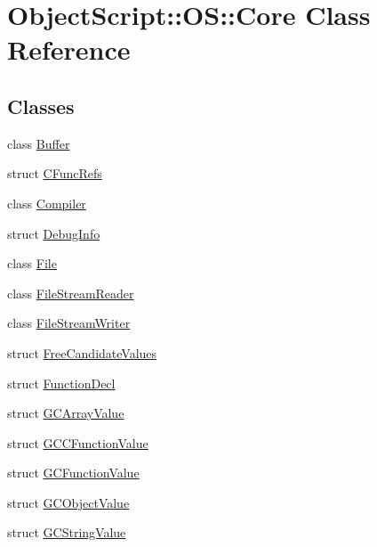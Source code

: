 \hypertarget{class_object_script_1_1_o_s_1_1_core}{}\section{Object\+Script\+:\+:OS\+:\+:Core Class Reference}
\label{class_object_script_1_1_o_s_1_1_core}
\subsection*{Classes}
\begin{DoxyCompactItemize}
\item 
class \hyperlink{class_object_script_1_1_o_s_1_1_core_1_1_buffer}{Buffer}
\item 
struct \hyperlink{struct_object_script_1_1_o_s_1_1_core_1_1_c_func_refs}{C\+Func\+Refs}
\item 
class \hyperlink{class_object_script_1_1_o_s_1_1_core_1_1_compiler}{Compiler}
\item 
struct \hyperlink{struct_object_script_1_1_o_s_1_1_core_1_1_debug_info}{Debug\+Info}
\item 
class \hyperlink{class_object_script_1_1_o_s_1_1_core_1_1_file}{File}
\item 
class \hyperlink{class_object_script_1_1_o_s_1_1_core_1_1_file_stream_reader}{File\+Stream\+Reader}
\item 
class \hyperlink{class_object_script_1_1_o_s_1_1_core_1_1_file_stream_writer}{File\+Stream\+Writer}
\item 
struct \hyperlink{struct_object_script_1_1_o_s_1_1_core_1_1_free_candidate_values}{Free\+Candidate\+Values}
\item 
struct \hyperlink{struct_object_script_1_1_o_s_1_1_core_1_1_function_decl}{Function\+Decl}
\item 
struct \hyperlink{struct_object_script_1_1_o_s_1_1_core_1_1_g_c_array_value}{G\+C\+Array\+Value}
\item 
struct \hyperlink{struct_object_script_1_1_o_s_1_1_core_1_1_g_c_c_function_value}{G\+C\+C\+Function\+Value}
\item 
struct \hyperlink{struct_object_script_1_1_o_s_1_1_core_1_1_g_c_function_value}{G\+C\+Function\+Value}
\item 
struct \hyperlink{struct_object_script_1_1_o_s_1_1_core_1_1_g_c_object_value}{G\+C\+Object\+Value}
\item 
struct \hyperlink{struct_object_script_1_1_o_s_1_1_core_1_1_g_c_string_value}{G\+C\+String\+Value}

\end{DoxyCompactItemize}
